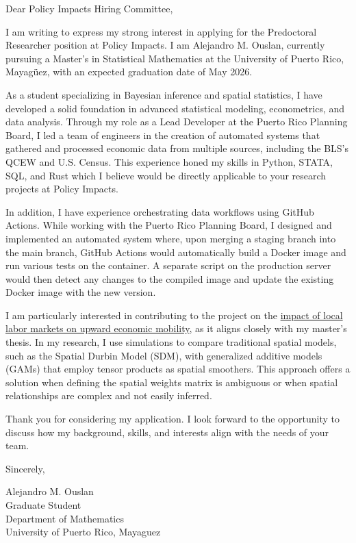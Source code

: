 \documentclass{article}
\begin{document}
\bigskip %

Dear Policy Impacts Hiring Committee,

\bigskip %

I am writing to express my strong interest in applying for the Predoctoral Researcher position at Policy Impacts.
I am Alejandro M. Ouslan, currently pursuing a Master’s in Statistical Mathematics at the University of Puerto Rico, Mayagüez, with an expected graduation date of May 2026.

As a student specializing in Bayesian inference and spatial statistics, I have developed a solid foundation in advanced statistical modeling, econometrics, and data analysis.
Through my role as a Lead Developer at the Puerto Rico Planning Board, I led a team of engineers in the creation of automated systems that gathered and processed economic data
from multiple sources, including the BLS’s QCEW and U.S. Census. This experience honed my skills in Python, STATA, SQL, and Rust which I believe would be directly
applicable to your research projects at Policy Impacts.

In addition, I have experience orchestrating data workflows using GitHub Actions. While working with the Puerto Rico Planning Board, I designed and implemented an 
automated system where, upon merging a staging branch into the main branch, GitHub Actions would automatically build a Docker image and run various tests on the 
container. A separate script on the production server would then detect any changes to the compiled image and update the existing Docker image with the new version.

I am particularly interested in contributing to the project on the 
\href{https://policyimpacts.org/research/the-radius-of-opportunity-evidence-from-migration-and-local-labor-markets/}{impact of local labor markets on upward economic mobility}, 
as it aligns closely with my master’s thesis. In my research, I use simulations to compare traditional spatial models, such as the Spatial Durbin Model (SDM), with generalized 
additive models (GAMs) that employ tensor products as spatial smoothers. This approach offers a solution when defining the spatial weights matrix is ambiguous or when spatial
relationships are complex and not easily inferred.


Thank you for considering my application. I look forward to the opportunity to discuss how my background, skills, and interests align with the needs of your team.

Sincerely,  
\vspace{20pt}  

Alejandro M. Ouslan \\
Graduate Student \\
Department of Mathematics \\
University of Puerto Rico, Mayaguez
\end{document}
